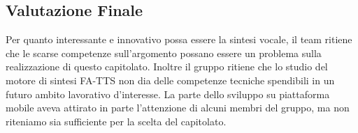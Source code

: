 \subsection{Valutazione Finale}
Per quanto interessante e innovativo possa essere la sintesi vocale, il team ritiene che le scarse competenze sull’argomento possano essere un problema sulla realizzazione di questo capitolato. Inoltre il gruppo ritiene che lo studio del motore di sintesi FA-TTS non dia delle competenze tecniche spendibili in un futuro ambito lavorativo d’interesse.
La parte dello sviluppo su piattaforma mobile aveva attirato in parte l’attenzione di alcuni membri del gruppo, ma non riteniamo sia sufficiente per la scelta del capitolato.
